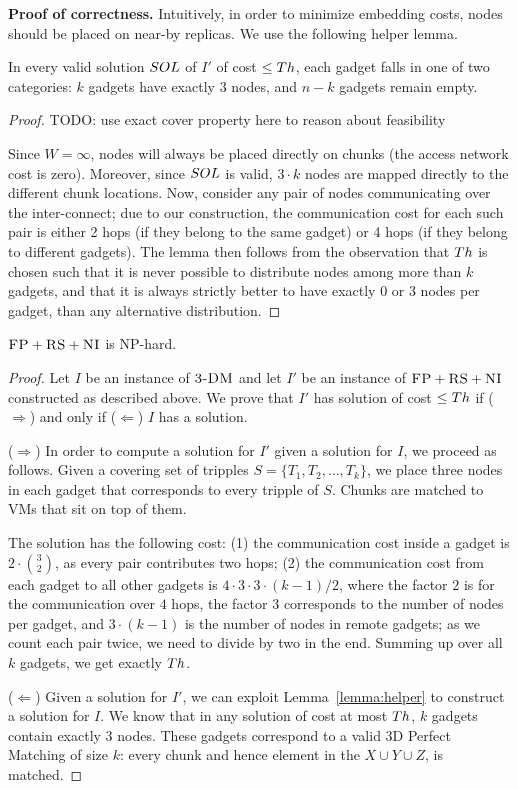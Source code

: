 \textbf{Proof of correctness.}
Intuitively, in order to minimize embedding costs,
nodes should be placed on near-by replicas. We use the following
helper lemma.
\begin{lemma}\label{lemma:helper}
In every valid solution $SOL$ of $I'$ of cost $\leq Th$, each gadget
falls in one of two categories:
$k$ gadgets have exactly
$3$ nodes, and $n-k$ gadgets remain empty.
\end{lemma}
\begin{proof}
TODO: use exact cover property here to reason about feasibility

Since $W=\infty$, nodes will always be placed
directly on chunks (the access network cost is zero).
Moreover, since
$SOL$ is valid, $3 \cdot k$ nodes are mapped
directly to the different chunk locations.
Now, consider any pair of nodes communicating over the
inter-connect; due to our construction, the communication cost
for each such pair is either
2 hops (if they belong to the same gadget) or 4 hops (if they belong
to different gadgets).
The lemma then follows from the observation that $Th$
is chosen such that it is never possible to distribute nodes
among more than $k$ gadgets, and that it is always strictly better to
have exactly 0 or 3 nodes per gadget, than any alternative distribution.
\end{proof}

\begin{theorem}
$\textsc{FP}+\textsc{RS}+\textsc{NI}$ is NP-hard.
\end{theorem}
\begin{proof}
Let $I$ be an instance of $\textsc{3-DM}$ and let $I'$ be an instance of
$\textsc{FP}+\textsc{RS}+\textsc{NI}$ constructed as described above.
We prove that $I'$ has solution of cost $\leq Th$ if ($\Rightarrow$) and only if
($\Leftarrow$)
$I$ has a solution.

($\Rightarrow$) In order to compute a solution
for $I'$ given a solution for $I$, we proceed as follows.
Given a covering set of tripples $S = \{T_1, T_2, \ldots, T_k\}$, we place three nodes in each gadget that
corresponds to every tripple of $S$. Chunks are matched to VMs that sit on top of them.

The solution has the following cost:
(1) the communication cost inside a gadget is $2 \cdot {3 \choose 2}$,
  as every pair contributes two hops;
  (2) the communication cost from each gadget to all other gadgets is $4
  \cdot 3 \cdot 3 \cdot (k - 1) / 2$, where the factor $2$ is
  for the
  communication over $4$ hops, the factor $3$
  corresponds to the number of nodes per gadget, and
  $3 \cdot (k-1)$ is the number of nodes in remote gadgets;
  as we count each pair twice, we need to divide by two in the end.
Summing up over all $k$ gadgets, we get exactly $Th$.

($\Leftarrow$) Given a solution for $I'$,
we can exploit Lemma~\ref{lemma:helper} to construct a solution for $I$.
We know that in any solution of cost at most $Th$,
$k$ gadgets contain exactly 3 nodes. These gadgets correspond to a valid
3D Perfect Matching of size $k$: every
chunk and hence element in the $X \cup Y \cup Z$, is matched.
\end{proof}

